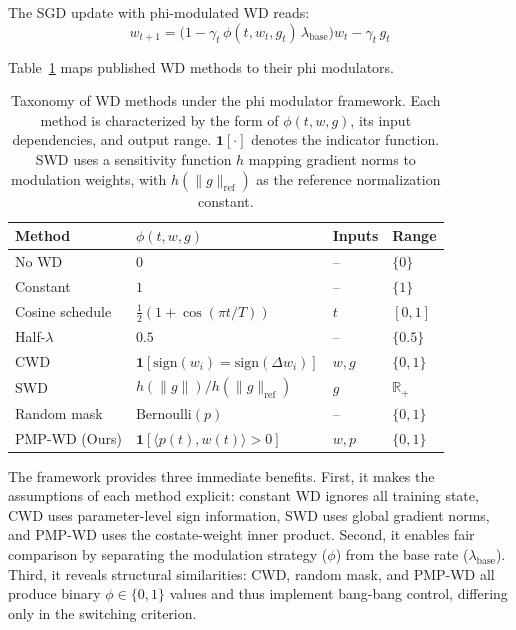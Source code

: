 \documentclass{article}
\begin{document}
The SGD update with phi-modulated WD reads:
\begin{equation}
w_{t+1} = \bigl(1 - \gamma_t \, \phi(t, w_t, g_t) \, \lambda_{\text{base}}\bigr) w_t - \gamma_t \, g_t
\label{eq:update}
\end{equation}

Table~\ref{tab:phi_taxonomy} maps published WD methods to their phi modulators.

\begin{table}[t]
  \caption{Taxonomy of WD methods under the phi modulator framework. Each method is characterized by the form of $\phi(t, w, g)$, its input dependencies, and output range. $\mathbf{1}[\cdot]$ denotes the indicator function. SWD uses a sensitivity function $h$ mapping gradient norms to modulation weights, with $h(\|g\|_{\text{ref}})$ as the reference normalization constant.}
  \label{tab:phi_taxonomy}
  \centering
  \small
  \begin{tabular}{llll}
    \toprule
    Method & $\phi(t, w, g)$ & Inputs & Range \\
    \midrule
    No WD & $0$ & -- & $\{0\}$ \\
    Constant & $1$ & -- & $\{1\}$ \\
    Cosine schedule & $\tfrac{1}{2}(1 + \cos(\pi t / T))$ & $t$ & $[0, 1]$ \\
    Half-$\lambda$ & $0.5$ & -- & $\{0.5\}$ \\
    CWD \citep{chen2026cwd} & $\mathbf{1}[\text{sign}(w_i) = \text{sign}(\Delta w_i)]$ & $w, g$ & $\{0, 1\}$ \\
    SWD \citep{xie2023swd} & $h(\|g\|) / h(\|g\|_{\text{ref}})$ & $g$ & $\mathbb{R}_+$ \\
    Random mask & $\text{Bernoulli}(p)$ & -- & $\{0, 1\}$ \\
    PMP-WD (Ours) & $\mathbf{1}[\langle p(t), w(t) \rangle > 0]$ & $w, p$ & $\{0, 1\}$ \\
    \bottomrule
  \end{tabular}
\end{table}

The framework provides three immediate benefits. First, it makes the assumptions of each method explicit: constant WD ignores all training state, CWD uses parameter-level sign information, SWD uses global gradient norms, and PMP-WD uses the costate-weight inner product. Second, it enables fair comparison by separating the modulation strategy ($\phi$) from the base rate ($\lambda_{\text{base}}$). Third, it reveals structural similarities: CWD, random mask, and PMP-WD all produce binary $\phi \in \{0, 1\}$ values and thus implement bang-bang control, differing only in the switching criterion.
\end{document}
